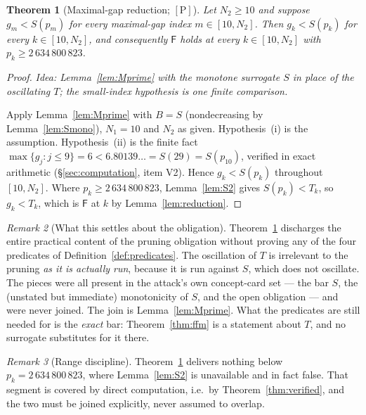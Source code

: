 \documentclass[11pt,a4paper]{article}
\theoremstyle{plain}
\newtheorem{theorem}{Theorem}[section]
\theoremstyle{definition}
\theoremstyle{remark}
\newtheorem{remark}[theorem]{Remark}
\newcommand{\idea}[1]{\emph{Idea: #1}\par\smallskip}
\newcommand{\cP}{{[\mathrm{P}]}}
\newcommand{\Fb}{\mathsf{F}}
\begin{document}
\begin{theorem}[Maximal-gap reduction; $\cP$]
\label{thm:B}
Let $N_2 \ge 10$ and suppose $g_m < S(p_m)$ for every maximal-gap index $m \in [10, N_2]$.
Then $g_k < S(p_k)$ for every $k \in [10, N_2]$, and consequently $\Fb$ holds at every
$k \in [10, N_2]$ with $p_k \ge 2\,634\,800\,823$.
\end{theorem}

\begin{proof}
\idea{Lemma~\ref{lem:Mprime} with the monotone surrogate $S$ in place of the oscillating
$T$; the small-index hypothesis is one finite comparison.}
Apply Lemma~\ref{lem:Mprime} with $B = S$ (nondecreasing by Lemma~\ref{lem:Smono}),
$N_1 = 10$ and $N_2$ as given. Hypothesis~(i) is the assumption. Hypothesis~(ii) is the
finite fact $\max\{g_j : j \le 9\} = 6 < 6.80139\ldots = S(29) = S(p_{10})$, verified in
exact arithmetic (\S\ref{sec:computation}, item V2). Hence $g_k < S(p_k)$
throughout $[10,N_2]$. Where $p_k \ge 2\,634\,800\,823$, Lemma~\ref{lem:S2} gives
$S(p_k) < T_k$, so $g_k < T_k$, which is $\Fb$ at $k$ by Lemma~\ref{lem:reduction}.
\end{proof}

\begin{remark}[What this settles about the obligation]
\label{rem:misdirected}
Theorem~\ref{thm:B} discharges the entire practical content of the pruning obligation without
proving any of the four predicates of Definition~\ref{def:predicates}. The oscillation of $T$
is irrelevant to the pruning \emph{as it is actually run}, because it is run against $S$, which
does not oscillate. The pieces were all present in the attack's own concept-card set --- the
bar $S$, the (unstated but immediate) monotonicity of $S$, and the open obligation --- and were
never joined. The join is Lemma~\ref{lem:Mprime}. What the predicates are still needed for is
the \emph{exact} bar: Theorem~\ref{thm:ffm} is a statement about $T$, and no surrogate
substitutes for it there.
\end{remark}

\begin{remark}[Range discipline]
Theorem~\ref{thm:B} delivers nothing below $p_k = 2\,634\,800\,823$, where
Lemma~\ref{lem:S2} is unavailable and in fact false. That segment is covered by direct
computation, i.e.\ by Theorem~\ref{thm:verified}, and the two must be joined explicitly,
never assumed to overlap.
\end{remark}
\end{document}
